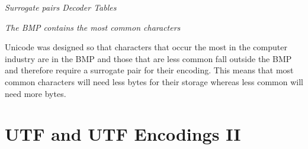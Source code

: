 \frmrule 











\frmrule 

\textit{Surrogate pairs Decoder Tables}




\frmrule 

\textit{The BMP contains the most common characters}

Unicode was designed so that characters that occur the most in the computer 
industry are in the BMP and those that are less common fall outside the BMP 
and therefore require a surrogate pair for their encoding. This means 
that most common characters will need less bytes for their storage
whereas less common will need more bytes. 






\section{UTF and UTF Encodings II}


